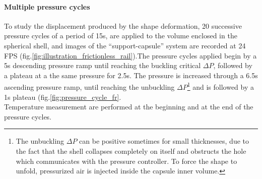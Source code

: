 \paragraph{Multiple pressure cycles}
To study the displacement produced by the shape deformation, 20 successive pressure cycles of a period of 15s, are applied to the volume enclosed in the spherical shell, and images of the "`support-capsule"' system are recorded at 24 FPS (fig.\ref{fig:illustration_frictionless_rail}).The pressure cycles applied begin by  a 5s descending pressure ramp until reaching the buckling critical $\Delta P$, followed by a plateau at a the same pressure for 2.5s. The pressure is increased through a 6.5s ascending pressure ramp, until reaching the unbuckling $\Delta P$\footnote{The unbuckling $\Delta P$ can be positive sometimes for small thicknesses, due to the fact that the shell collapses completely on itself and obstructs the hole which communicates with the pressure controller. To force the shape to unfold, pressurized air is injected inside the capsule inner volume.} and is followed by a 1s plateau (fig.\ref{fig:pressure_cycle_fr}.\\
Temperature measurement are performed at the beginning and at the end of the pressure cycles.
